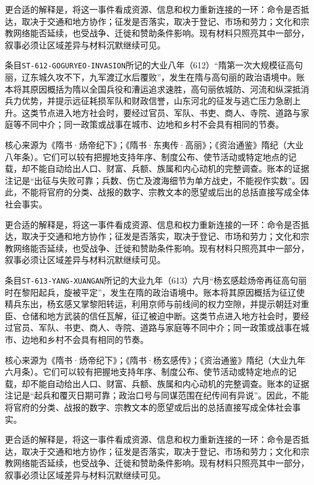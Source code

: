 更合适的解释是，将这一事件看成资源、信息和权力重新连接的一环：命令是否抵达，取决于交通和地方协作；征发是否落实，取决于登记、市场和劳力；文化和宗教网络能否延续，也受战争、迁徙和赞助条件影响。现有材料只照亮其中一部分，叙事必须让区域差异与材料沉默继续可见。


条目\texttt{ST-612-GOGURYEO-INVASION}所记的大业八年（612）“隋第一次大规模征高句丽，辽东城久攻不下，九军渡辽水后覆败”，发生在隋与高句丽的政治语境中。账本将其原因概括为隋以全国兵役和漕运追求速胜，高句丽依城防、河流和纵深抵消兵力优势，并提示远征耗损军队和财政信誉，山东河北的征发与逃亡压力急剧上升。这类节点进入地方社会时，要经过官员、军队、书吏、商人、寺院、道路与家庭等不同中介；同一政策或战事在城市、边地和乡村不会具有相同的节奏。

核心来源为《隋书·炀帝纪下》；《隋书·东夷传·高丽》；《资治通鉴》隋纪（大业八年条）。它们可以较有把握地支持年序、制度公布、使节活动或特定地点的记载，却不能自动给出人口、财富、兵额、族属和内心动机的完整调查。账本的证据注记是“出征与失败可靠；兵数、伤亡及渡海细节为单方战史，不能视作实数”。因此，不能将官府的分类、战报的数字、宗教文本的愿望或后出的总括直接写成全体社会事实。

更合适的解释是，将这一事件看成资源、信息和权力重新连接的一环：命令是否抵达，取决于交通和地方协作；征发是否落实，取决于登记、市场和劳力；文化和宗教网络能否延续，也受战争、迁徙和赞助条件影响。现有材料只照亮其中一部分，叙事必须让区域差异与材料沉默继续可见。


条目\texttt{ST-613-YANG-XUANGAN}所记的大业九年（613）六月“杨玄感趁炀帝再征高句丽时在黎阳起兵，旋被平定”，发生在隋的政治语境中。账本将其原因概括为征辽使精兵东出，杨玄感又掌黎阳转运，利用京师与前线间的权力空隙，并提示朝廷对重臣、仓储和地方武装的信任瓦解，征辽被迫中断。这类节点进入地方社会时，要经过官员、军队、书吏、商人、寺院、道路与家庭等不同中介；同一政策或战事在城市、边地和乡村不会具有相同的节奏。

核心来源为《隋书·炀帝纪下》；《隋书·杨玄感传》；《资治通鉴》隋纪（大业九年六月条）。它们可以较有把握地支持年序、制度公布、使节活动或特定地点的记载，却不能自动给出人口、财富、兵额、族属和内心动机的完整调查。账本的证据注记是“起兵和覆灭日期可靠；政治口号与同谋范围在纪传间有异说”。因此，不能将官府的分类、战报的数字、宗教文本的愿望或后出的总括直接写成全体社会事实。

更合适的解释是，将这一事件看成资源、信息和权力重新连接的一环：命令是否抵达，取决于交通和地方协作；征发是否落实，取决于登记、市场和劳力；文化和宗教网络能否延续，也受战争、迁徙和赞助条件影响。现有材料只照亮其中一部分，叙事必须让区域差异与材料沉默继续可见。


